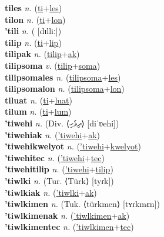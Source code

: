 \textbf{tiles} \textit{n.} (\hyperref[ti]{ti}+\hyperref[les]{les})
 \label{tiles} \\
\textbf{tilon} \textit{n.} (\hyperref[ti]{ti}+\hyperref[lon]{lon})
 \label{tilon} \\
\textbf{'tili} \textit{n.} ( [dɪlliː])
 \label{'tili} \\
\textbf{tilip} \textit{n.} (\hyperref[ti]{ti}+\hyperref[lip]{lip})
 \label{tilip} \\
\textbf{tilipak} \textit{n.} (\hyperref[tilip]{tilip}+\hyperref[ak]{ak})
 \label{tilipak} \\
\textbf{tilipsoma} \textit{v.} (\hyperref[tilip]{tilip}+\hyperref[soma]{soma})
 \label{tilipsoma} \\
\textbf{tilipsomales} \textit{n.} (\hyperref[tilipsoma]{tilipsoma}+\hyperref[les]{les})
 \label{tilipsomales} \\
\textbf{tilipsomalon} \textit{n.} (\hyperref[tilipsoma]{tilipsoma}+\hyperref[lon]{lon})
 \label{tilipsomalon} \\
\textbf{tiluat} \textit{n.} (\hyperref[ti]{ti}+\hyperref[luat]{luat})
 \label{tiluat} \\
\textbf{tilum} \textit{n.} (\hyperref[ti]{ti}+\hyperref[lum]{lum})
 \label{tilum} \\
\textbf{'tiwehi} \textit{n.} (Div. ⟨ދިވެހި⟩ [diˈʋehi])
 \label{'tiwehi} \\
\textbf{'tiwehiak} \textit{n.} (\hyperref['tiwehi]{'tiwehi}+\hyperref[ak]{ak})
 \label{'tiwehiak} \\
\textbf{'tiwehikwelyot} \textit{n.} (\hyperref['tiwehi]{'tiwehi}+\hyperref[kwelyot]{kwelyot})
 \label{'tiwehikwelyot} \\
\textbf{'tiwehitec} \textit{n.} (\hyperref['tiwehi]{'tiwehi}+\hyperref[tec]{tec})
 \label{'tiwehitec} \\
\textbf{'tiwehitilip} \textit{n.} (\hyperref['tiwehi]{'tiwehi}+\hyperref[tilip]{tilip})
 \label{'tiwehitilip} \\
\textbf{'tiwlki} \textit{n.} (Tur. ⟨Türk⟩ [tyɾk])
 \label{'tiwlki} \\
\textbf{'tiwlkiak} \textit{n.} (\hyperref['tiwlki]{'tiwlki}+\hyperref[ak]{ak})
 \label{'tiwlkiak} \\
\textbf{'tiwlkimen} \textit{n.} (Tuk. ⟨türkmen⟩ [tʏɾkmɛn])
 \label{'tiwlkimen} \\
\textbf{'tiwlkimenak} \textit{n.} (\hyperref['tiwlkimen]{'tiwlkimen}+\hyperref[ak]{ak})
 \label{'tiwlkimenak} \\
\textbf{'tiwlkimentec} \textit{n.} (\hyperref['tiwlkimen]{'tiwlkimen}+\hyperref[tec]{tec})
